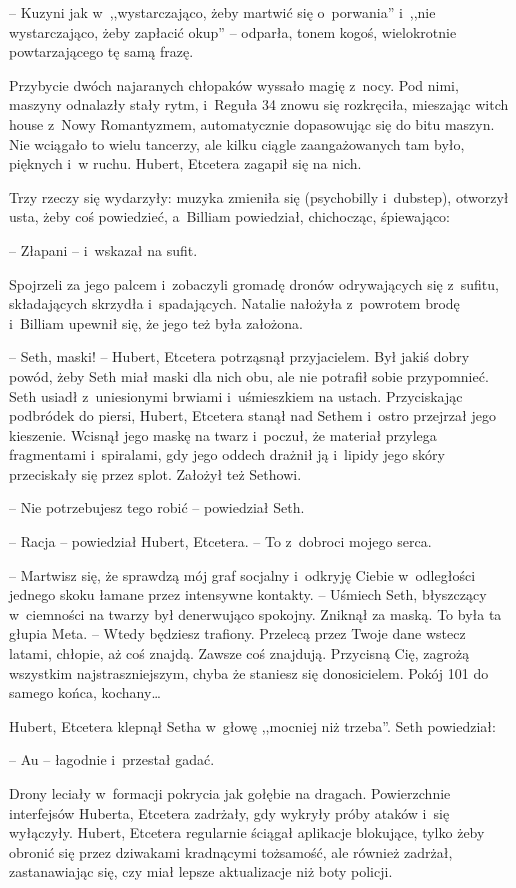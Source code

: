 \documentclass[oneside,polish,11pt,sfheadings]{mwbk}
\begin{document}
-- Kuzyni jak w~,,wystarczająco, żeby martwić się o~porwania'' i~,,nie
wystarczająco, żeby zapłacić okup'' -- odparła, tonem kogoś, wielokrotnie
powtarzającego tę samą frazę.

Przybycie dwóch najaranych chłopaków wyssało magię z~nocy. Pod nimi,
maszyny odnalazły stały rytm, i~Reguła 34 znowu się rozkręciła,
mieszając witch house z~Nowy Romantyzmem, automatycznie dopasowując się
do bitu maszyn. Nie wciągało to wielu tancerzy, ale kilku ciągle
zaangażowanych tam było, pięknych i~w ruchu. Hubert, Etcetera zagapił
się na nich.

Trzy rzeczy się wydarzyły: muzyka zmieniła się (psychobilly i~dubstep),
otworzył usta, żeby coś powiedzieć, a~Billiam powiedział, chichocząc,
śpiewająco: 

-- Złapani -- i~wskazał na sufit.

Spojrzeli za jego palcem i~zobaczyli gromadę dronów odrywających się z~sufitu, składających skrzydła i~spadających. Natalie nałożyła z~powrotem
brodę i~Billiam upewnił się, że jego też była założona.

-- Seth, maski! -- Hubert, Etcetera potrząsnął przyjacielem. Był jakiś
dobry powód, żeby Seth miał maski dla nich obu, ale nie potrafił sobie
przypomnieć. Seth usiadł z~uniesionymi brwiami i~uśmieszkiem na ustach.
Przyciskając podbródek do piersi, Hubert, Etcetera stanął nad Sethem i~ostro przejrzał jego kieszenie. Wcisnął jego maskę na twarz i~poczuł, że
materiał przylega fragmentami i~spiralami, gdy jego oddech drażnił ją i~lipidy jego skóry przeciskały się przez splot. Założył też Sethowi.

-- Nie potrzebujesz tego robić -- powiedział Seth.

-- Racja -- powiedział Hubert, Etcetera. -- To z~dobroci mojego serca.

-- Martwisz się, że sprawdzą mój graf socjalny i~odkryję Ciebie w~odległości jednego skoku łamane przez intensywne kontakty. -- Uśmiech
Seth, błyszczący w~ciemności na twarzy był denerwująco spokojny. Zniknął
za maską. To była ta głupia Meta. -- Wtedy będziesz trafiony. Przelecą
przez Twoje dane wstecz latami, chłopie, aż coś znajdą. Zawsze coś
znajdują. Przycisną Cię, zagrożą wszystkim najstraszniejszym, chyba że
staniesz się donosicielem. Pokój 101 do samego końca, kochany\ldots 

Hubert, Etcetera klepnął Setha w~głowę ,,mocniej niż trzeba''. Seth
powiedział: 

-- Au -- łagodnie i~przestał gadać. 

Drony leciały w~formacji
pokrycia jak gołębie na dragach. Powierzchnie interfejsów Huberta,
Etcetera zadrżały, gdy wykryły próby ataków i~się wyłączyły. Hubert,
Etcetera regularnie ściągał aplikacje blokujące, tylko żeby obronić się
przez dziwakami kradnącymi tożsamość, ale również zadrżał, zastanawiając
się, czy miał lepsze aktualizacje niż boty policji.
\end{document}

